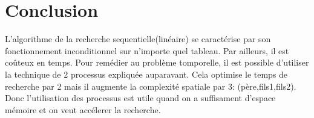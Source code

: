 \section{Conclusion}
L'algorithme de la recherche sequentielle(linéaire) se caractérise par son fonctionnement inconditionnel sur n'importe quel tableau. Par ailleurs, il est coûteux en temps. Pour remédier au problème tomporelle, il est possible d'utiliser  la technique de 2 processus expliquée auparavant. Cela optimise le temps de recherche par 2 mais il augmente la complexité spatiale par 3: (père,fils1,fils2). Donc l'utilisation des processus est utile quand on a suffisament d'espace mémoire et on veut accélerer la recherche.